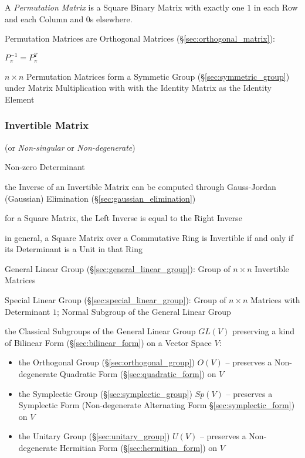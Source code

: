 A \emph{Permutation Matrix} is a Square Binary Matrix with exactly one
$1$ in each Row and each Column and $0$s elsewhere.

Permutation Matrices are Orthogonal Matrices (\S\ref{sec:orthogonal_matrix}):

$P_\pi^{-1} = P_\pi^T$

$n \times n$ Permutation Matrices form a Symmetic Group
(\S\ref{sec:symmetric_group}) under Matrix Multiplication with
with the Identity Matrix as the Identity Element



\subsubsection{Invertible Matrix}\label{sec:invertible_matrix}

(or \emph{Non-singular} or \emph{Non-degenerate})

Non-zero Determinant

\fist the Inverse of an Invertible Matrix can be computed through Gauss-Jordan
(Gaussian) Elimination (\S\ref{sec:gaussian_elimination})

for a Square Matrix, the Left Inverse is equal to the Right Inverse

in general, a Square Matrix over a Commutative Ring is Invertible if and only
if its Determinant is a Unit in that Ring

\fist General Linear Group (\S\ref{sec:general_linear_group}): Group of $n
\times n$ Invertible Matrices

\fist Special Linear Group (\S\ref{sec:special_linear_group}): Group of $n
\times n$ Matrices with Determinant $1$; Normal Subgroup of the General Linear
Group

the Classical Subgroups of the General Linear Group $GL(V)$ preserving a kind
of Bilinear Form (\S\ref{sec:bilinear_form}) on a Vector Space $V$:
\begin{itemize}
  \item the Orthogonal Group (\S\ref{sec:orthogonal_group}) $O(V)$ -- preserves
    a Non-degenerate Quadratic Form (\S\ref{sec:quadratic_form}) on $V$
  \item the Symplectic Group (\S\ref{sec:symplectic_group}) $Sp(V)$
    -- preserves a Symplectic Form (Non-degenerate Alternating Form
    \S\ref{sec:symplectic_form}) on $V$
  \item the Unitary Group (\S\ref{sec:unitary_group}) $U(V)$
    -- preserves a Non-degenerate Hermitian Form (\S\ref{sec:hermitian_form})
    on $V$
\end{itemize}

